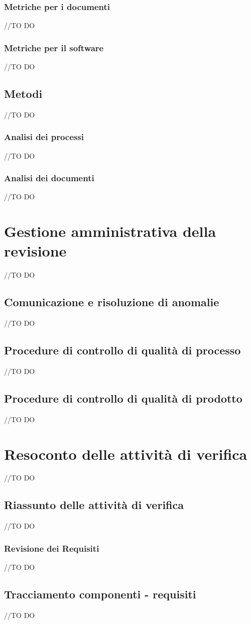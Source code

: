 \documentclass[12pt,a4paper]{article}
\begin{document}
\subsubsection{Metriche per i documenti}
//TO DO
\subsubsection{ Metriche per il software}
//TO DO
\subsection{Metodi}
//TO DO
\subsubsection{Analisi dei processi}
//TO DO
\subsubsection{Analisi dei documenti}
//TO DO
\newpage
\section{Gestione amministrativa della revisione}
//TO DO
\subsection{Comunicazione e risoluzione di anomalie}
//TO DO
\subsection{Procedure di controllo di qualità di processo}
//TO DO
\subsection{Procedure di controllo di qualità di prodotto}
//TO DO
\newpage
\section{ Resoconto delle attività di verifica}
//TO DO
\subsection{Riassunto delle attività di verifica}
//TO DO
\subsubsection{Revisione dei Requisiti}
//TO DO
\subsection{Tracciamento componenti - requisiti}
//TO DO
\end{document}
